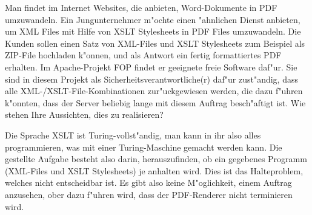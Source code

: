 Man findet im Internet Websites, die anbieten, Word-Dokumente in PDF
umzuwandeln.
Ein Jungunternehmer m"ochte einen "ahnlichen Dienst anbieten, um XML Files
mit Hilfe von XSLT Stylesheets in PDF Files umzuwandeln.
Die Kunden sollen einen Satz von XML-Files und XSLT Stylesheets zum
Beispiel als ZIP-File hochladen k"onnen, und als Antwort ein fertig
formattiertes PDF erhalten.
Im Apache-Projekt FOP findet er geeignete freie Software daf"ur.
Sie sind in diesem Projekt als Sicherheitsverantwortliche(r) daf"ur zust"andig,
dass alle XML-/XSLT-File-Kombinationen zur"uckgewiesen werden, die dazu f"uhren
k"onnten, dass der Server beliebig lange mit diesem Auftrag besch"aftigt ist.
Wie stehen Ihre Aussichten, dies zu realisieren?

\begin{loesung}
Die Sprache XSLT ist Turing-vollst"andig, man kann in ihr also alles
programmieren, was mit einer Turing-Maschine gemacht werden kann.
Die gestellte Aufgabe besteht also darin, herauszufinden, ob ein
gegebenes Programm (XML-Files und XSLT Stylesheets) je anhalten wird.
Dies ist das Halteproblem, welches nicht entscheidbar ist.
Es gibt also keine M"oglichkeit, einem Auftrag anzusehen, ober dazu
f"uhren wird, dass der PDF-Renderer nicht terminieren wird.
\end{loesung}

